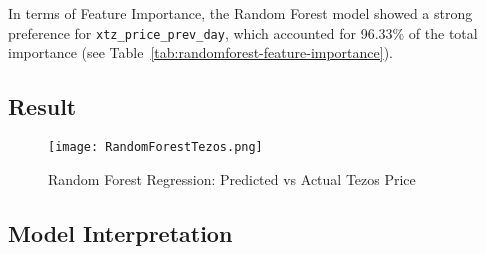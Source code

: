 In terms of Feature Importance, the Random Forest model showed a strong preference for \texttt{xtz\_price\_prev\_day}, which accounted for 96.33\% of the total importance (see Table~\ref{tab:randomforest-feature-importance}).


\subsection{Result}
\begin{figure}[H]
    \centering
    \texttt{[image: RandomForestTezos.png]}
    \caption{Random Forest Regression: Predicted vs Actual Tezos Price}
    \label{fig:randomforest-tezos}
\end{figure}

\subsection{Model Interpretation}

